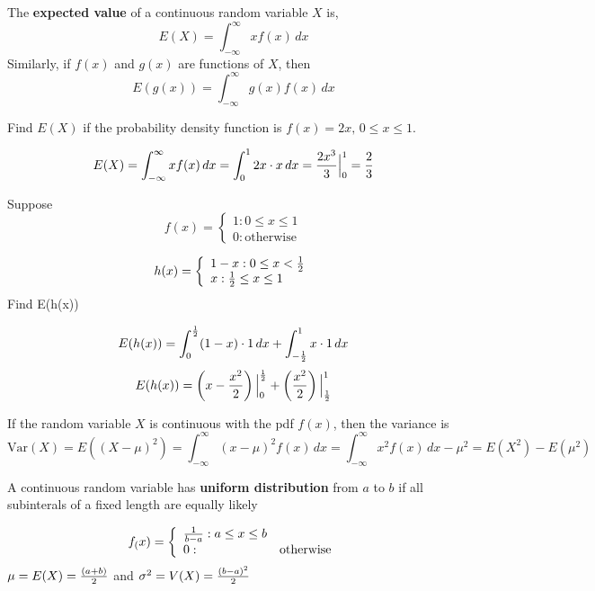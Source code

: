 \documentclass[english, 12pt]{article}
\begin{document}
\begin{defn}
The \textbf{expected value} of a continuous random variable $X$ is,
\[E(X) = \int_{-\infty}^\infty x f(x)\,dx\]
Similarly, if $f(x)$ and $g(x)$ are functions of $X$, then
\[E(g(x)) = \int_{-\infty}^\infty g(x) f(x)\,dx\]
\end{defn}

\begin{exmp}
Find $E(X)$ if the probability density function is $f(x) = 2x,\, 0 \leq x \leq 1$.

\begin{sol}
\[E(X) = \int_{-\infty}^\infty x f(x)\,dx = \int_0^1 2x \cdot x\,dx = \frac{2x^3}{3}\Big|_0^1 = \frac{2}{3}\]
\end{sol}
\end{exmp}

\begin{exmp}
Suppose
\begin{displaymath}
   f(x) = \left\{
     \begin{array}{lr}
       1 : 0 \leq x \leq 1 \\
       0 : \text{otherwise}
     \end{array}
   \right.
\end{displaymath}

\begin{displaymath}
   h(x) = \left\{
     \begin{array}{lr}
       1-x : 0 \leq x < \frac{1}{2} \\
       x : \frac{1}{2} \leq x \leq 1
     \end{array}
   \right.
\end{displaymath}
Find E(h(x))

\begin{sol}
\[E(h(x)) = \int_0^{\frac{1}{2}} (1-x)\cdot 1\,dx + \int_{-\frac{1}{2}}^1 x \cdot 1\,dx\]
\[E(h(x)) = \left(x - \frac{x^2}{2}\right)\Big|_0^{\frac{1}{2}} + \left(\frac{x^2}{2}\right)\Big|_{\frac{1}{2}}^1\]
\end{sol}
\end{exmp}

\begin{defn}
If the random variable $X$ is continuous with the pdf $f(x)$, then the variance is
\[\text{Var}(X) = E((X-\mu)^2) = \int_{-\infty}^\infty (x-\mu)^2 f(x)\,dx = \int_{-\infty}^\infty x^2 f(x)\,dx - \mu^2 = E(X^2) - E(\mu^2)\]
\end{defn}

\begin{defn}
A continuous random variable has \textbf{uniform distribution} from $a$ to $b$ if all subinterals of a fixed length are equally likely

\begin{displaymath}
   f_(x) = \left\{
     \begin{array}{lr}
       \frac{1}{b-a} :  a \leq x \leq b \\
       0 : & \text{otherwise}\\
     \end{array}
   \right.
\end{displaymath}
$\mu = E(X) = \frac{(a+b)}{2}$ and $\sigma^2 = V(X) = \frac{(b-a)^2}{2}$
\end{defn}
\end{document}
